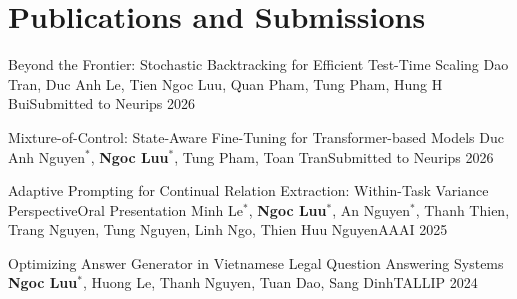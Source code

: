 \section{Publications and Submissions}
\resumeSubHeadingListStart

    \resumeSubheading
    {Beyond the Frontier: Stochastic Backtracking for Efficient Test-Time Scaling}{}
    {Dao Tran, Duc Anh Le, Tien Ngoc Luu, Quan Pham, Tung Pham, Hung H Bui}{Submitted to Neurips 2026}

    \resumeSubheading
    {Mixture-of-Control: State-Aware Fine-Tuning for Transformer-based Models}{}
    {Duc Anh Nguyen$^*$, \textbf{Ngoc Luu}$^*$, Tung Pham, Toan Tran}{Submitted to Neurips 2026}
    
    \resumeSubheading
    {Adaptive Prompting for Continual Relation Extraction: Within-Task Variance Perspective}{Oral Presentation}
    {Minh Le$^*$, \textbf{Ngoc Luu}$^*$, An Nguyen$^*$, Thanh Thien, Trang Nguyen, Tung Nguyen, Linh Ngo, Thien Huu Nguyen}{AAAI 2025}

    \resumeSubheading
    {Optimizing Answer Generator in Vietnamese Legal Question Answering Systems}{}
    {\textbf{Ngoc Luu}$^*$, Huong Le, Thanh Nguyen, Tuan Dao, Sang Dinh}{TALLIP 2024}
    
\resumeSubHeadingListEnd